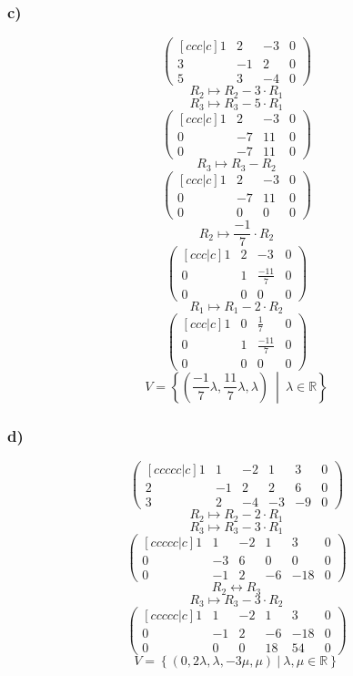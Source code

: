 \documentclass[lineaire_algebra_oplossingen.tex]{subfiles}
\begin{document}
\subsubsection*{c)}
\[
\begin{pmatrix}[ccc|c]
1 &  2 &  -3 & 0\\
3 &  -1 &  2 & 0\\
5 &  3 &  -4 & 0
\end{pmatrix}
\]
\[ R_2 \longmapsto R_2 -3\cdot R_1\]
\[ R_3 \longmapsto R_3 -5\cdot R_1\]
\[
\begin{pmatrix}[ccc|c]
1 &   2 &  -3 & 0\\
0 &  -7 &  11 & 0\\
0 &  -7 &  11 & 0
\end{pmatrix}
\]
\[ R_3 \longmapsto R_3 - R_2\]
\[
\begin{pmatrix}[ccc|c]
1 &  2 &  -3 & 0\\
0 & -7 &  11 & 0\\
0 &  0 &  0  & 0
\end{pmatrix}
\]
\[ R_2 \longmapsto \frac{-1}{7}\cdot R_2\]
\[
\begin{pmatrix}[ccc|c]
1 &  2 &  -3 & 0\\
0 & 1 &  \frac{-11}{7} & 0\\
0 &  0 &  0  & 0
\end{pmatrix}
\]
\[ R_1 \longmapsto R_1 -2\cdot R_2\]
\[
\begin{pmatrix}[ccc|c]
1 &  0 &  \frac{1}{7} & 0\\
0 & 1 &  \frac{-11}{7} & 0\\
0 &  0 &  0  & 0
\end{pmatrix}
\]
\[
V = \left\{\left( \frac{-1}{7}\lambda,\frac{11}{7}\lambda,\lambda \right)\ \middle|\  \lambda\in\mathbb{R} \right\}
\]
\subsubsection*{d)}
\[
\begin{pmatrix}[ccccc|c]
1 &  1 &  -2 & 1 & 3 & 0\\
2 &  -1 &  2 & 2 & 6 & 0\\
3 &  2 &  -4 & -3 & -9 & 0
\end{pmatrix}
\]
\[ R_2 \longmapsto R_2 -2\cdot R_1\]
\[ R_3 \longmapsto R_3 -3\cdot R_1\]
\[
\begin{pmatrix}[ccccc|c]
1 &  1 &  -2 & 1 & 3 & 0\\
0 &  -3 &  6 & 0 & 0 & 0\\
0 &  -1 &  2 & -6 & -18 & 0
\end{pmatrix}
\]
\[ R_2 \leftrightarrow R_3\]
\[ R_3 \longmapsto R_3 -3\cdot R_2\]
\[
\begin{pmatrix}[ccccc|c]
1 &  1 &  -2 & 1 & 3 & 0\\
0 &  -1 &  2 & -6 & -18 & 0\\
0 &  0 &  0 & 18 & 54 & 0
\end{pmatrix}
\]
\[
V = 
\left\{ 
\left( 0,2\lambda,\lambda,-3\mu,\mu  \right)
\ |\ \lambda,\mu\in\mathbb{R}
\right\}
\]
\end{document}
